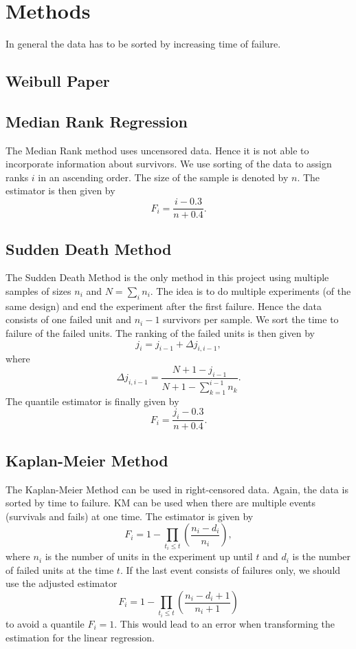 \section{Methods}
In general the data has to be sorted by increasing time of failure.

\subsection{Weibull Paper}

\subsection{Median Rank Regression}
The Median Rank method uses uncensored data. Hence it is not able to incorporate information about survivors. 
We use sorting of the data to assign ranks $i$ in an ascending order. The size of the sample is denoted by $n$. The estimator is then given by
$$ F_i = \frac{i - 0.3}{n + 0.4}.$$

\subsection{Sudden Death Method}
The Sudden Death Method is the only method in this project using multiple samples of sizes $n_i$ and $N = \sum_{i}n_i$. The idea is to do multiple experiments (of the same design) and end the experiment after the first failure. Hence the data consists of one failed unit and $n_i - 1$ survivors per sample. We sort the time to failure of the failed units. The ranking of the failed units is then given by
$$ j_i = j_{i-1} + \Delta j_{i,i-1}, $$
where
$$ \Delta j_{i, i-1} = \frac{N + 1 - j_{i-1}}{N + 1 - \sum_{k=1}^{i-1} n_k}.$$
The quantile estimator is finally given by
$$ F_i = \frac{j_i - 0.3}{n + 0.4}. $$

\subsection{Kaplan-Meier Method}
The Kaplan-Meier Method can be used in right-censored data. Again, the data is sorted by time to failure. KM can be used when there are multiple events (survivals and fails) at one time.
The estimator is given by
$$ F_i = 1 - \prod_{t_i \leq t} \left( \frac{n_i - d_i}{n_i} \right), $$
where $n_i$ is the number of units in the experiment up until $t$ and $d_i$ is the number of failed units at the time $t$.
If the last event consists of failures only, we should use the adjusted estimator
$$ F_i = 1 - \prod_{t_i \leq t} \left( \frac{n_i - d_i + 1}{n_i + 1} \right) $$
to avoid a quantile $F_i = 1$. This would lead to an error when transforming the estimation for the linear regression.

